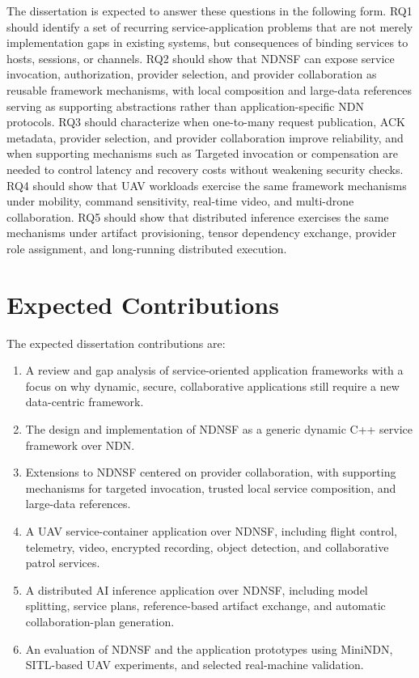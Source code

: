 The dissertation is expected to answer these questions in the following form.
RQ1 should identify a set of recurring service-application problems that are
not merely implementation gaps in existing systems, but consequences of
binding services to hosts, sessions, or channels. RQ2 should show that NDNSF
can expose service invocation, authorization, provider selection, and provider
collaboration as reusable framework mechanisms, with local composition and
large-data references serving as supporting abstractions rather than
application-specific NDN protocols. RQ3 should characterize when
one-to-many request publication, ACK metadata, provider selection, and provider
collaboration improve reliability, and when supporting mechanisms such as
Targeted invocation or compensation are needed to control latency and recovery
costs without weakening security checks. RQ4 should show that UAV workloads exercise the same framework
mechanisms under mobility, command sensitivity, real-time video, and
multi-drone collaboration. RQ5 should show that distributed inference exercises
the same mechanisms under artifact provisioning, tensor dependency exchange,
provider role assignment, and long-running distributed execution.

\section{Expected Contributions}

The expected dissertation contributions are:

\begin{enumerate}[leftmargin=*]
  \item A review and gap analysis of service-oriented application frameworks
  with a focus on why dynamic, secure, collaborative applications still require
  a new data-centric framework.
  \item The design and implementation of NDNSF as a generic dynamic C++ service
  framework over NDN.
  \item Extensions to NDNSF centered on provider collaboration, with
  supporting mechanisms for targeted invocation, trusted local service
  composition, and large-data references.
  \item A UAV service-container application over NDNSF, including flight
  control, telemetry, video, encrypted recording, object detection, and
  collaborative patrol services.
  \item A distributed AI inference application over NDNSF, including model
  splitting, service plans, reference-based artifact exchange, and automatic
  collaboration-plan generation.
  \item An evaluation of NDNSF and the application prototypes using MiniNDN,
  SITL-based UAV experiments, and selected real-machine validation.
\end{enumerate}

